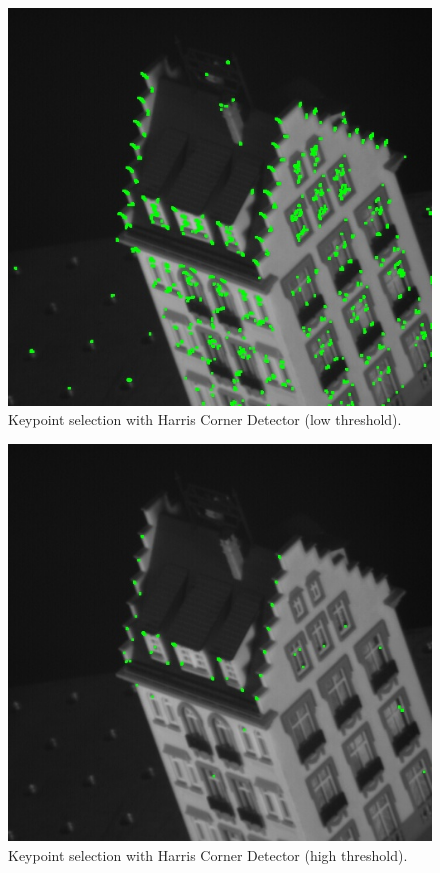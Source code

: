 \documentclass[]{IEEEtran}
\begin{document}
\begin{figure}[ht]
  \includegraphics[width=\linewidth]{./figures/klt/harris-low-threshold.jpg}
  \caption{Keypoint selection with Harris Corner Detector (low threshold).}
  \label{fig:harris_low}
\end{figure}

\begin{figure}[ht]
  \includegraphics[width=\linewidth]{./figures/klt/harris-high-threshold.jpg}
  \caption{Keypoint selection with Harris Corner Detector (high threshold).}
  \label{fig:harris_high}
\end{figure}
\end{document}
